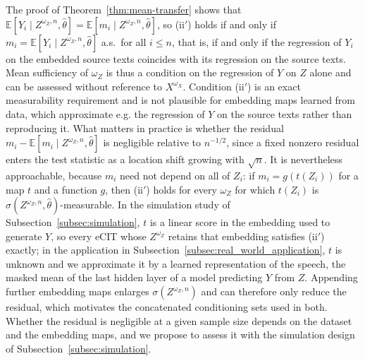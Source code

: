 \documentclass[twoside,11pt]{article}
\begin{document}
The proof of Theorem~\ref{thm:mean-transfer} shows that $\mathbb E[Y_i\mid Z^{\omega_Z,n},\hat\theta]=\mathbb E[m_i\mid Z^{\omega_Z,n},\hat\theta]$, so (ii$'$) holds if and only if $m_i=\mathbb E[Y_i\mid Z^{\omega_Z,n},\hat\theta]$ a.s.\ for all $i\le n$, that is, if and only if the regression of $Y_i$ on the embedded source texts coincides with its regression on the source texts. 
Mean sufficiency of $\omega_Z$ is thus a condition on the regression of $Y$ on $Z$ alone and can be assessed without reference to $X^{\omega_X}$.
Condition (ii$'$) is an exact measurability requirement and is not plausible for embedding maps learned from data, which approximate e.g. the regression of $Y$ on the source texts rather than reproducing it. 
What matters in practice is whether the residual $m_i-\mathbb E[m_i\mid Z^{\omega_Z,n},\hat\theta]$ is negligible relative to $n^{-1/2}$, since a fixed nonzero residual enters the test statistic as a location shift growing with $\sqrt n$. 
It is nevertheless approachable, because $m_i$ need not depend on all of $Z_i$: if $m_i=g(t(Z_i))$ for a map $t$ and a function $g$, then (ii$'$) holds for every $\omega_Z$ for which $t(Z_i)$ is $ \sigma(Z^{\omega_Z,n},\hat\theta)$-measurable. 
In the simulation study of Subsection~\ref{subsec:simulation}, $t$ is a linear score in the embedding used to generate $Y$, so every eCIT whose $Z^{\omega_Z}$ retains that embedding satisfies (ii$'$) exactly; in the application in Subsection~\ref{subsec:real_world_application}, $t$ is unknown and we approximate it by a learned representation of the speech, the masked mean of the last hidden layer of a model predicting $Y$ from $Z$. Appending further embedding maps enlarges $\sigma(Z^{\omega_Z,n})$ and can therefore only reduce the residual, which motivates the concatenated conditioning sets used in both. Whether the residual is negligible at a given sample size depends on the dataset and the embedding maps, and we propose to assess it with the simulation design of Subsection~\ref{subsec:simulation}.
\end{document}
